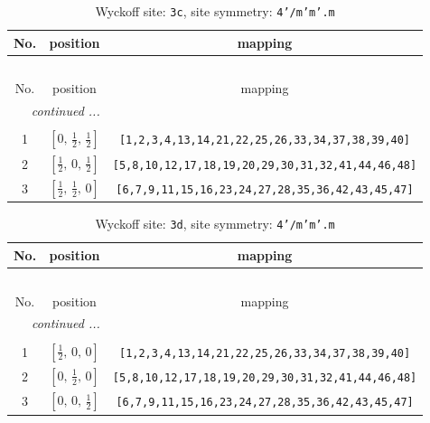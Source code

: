 \documentclass[fleqn,8pt]{jsarticle}
\begin{document}
\renewcommand{\arraystretch}{1.2}
\begin{longtable}{ccc}
\caption{Wyckoff site: {\tt 3c}, site symmetry: {\tt 4'/m'm'.m}}
 \\
 \hline \hline
No. & position & mapping \\ \hline \endfirsthead

\multicolumn{2}{l}{\tablename\ \thetable{}} \\
 \hline \hline
No. & position & mapping \\ \hline \endhead

 \hline \hline
\multicolumn{2}{r}{\footnotesize\it continued ...} \\ \endfoot

 \hline \hline
\multicolumn{2}{r}{} \\ \endlastfoot

1 & $\left[ 0,\, \frac{1}{2},\, \frac{1}{2} \right]$ & {\tt [1,2,3,4,13,14,21,22,25,26,33,34,37,38,39,40]} \\ \hline
2 & $\left[ \frac{1}{2},\, 0,\, \frac{1}{2} \right]$ & {\tt [5,8,10,12,17,18,19,20,29,30,31,32,41,44,46,48]} \\ \hline
3 & $\left[ \frac{1}{2},\, \frac{1}{2},\, 0 \right]$ & {\tt [6,7,9,11,15,16,23,24,27,28,35,36,42,43,45,47]} \\
\end{longtable}
\renewcommand{\arraystretch}{1.2}
\begin{longtable}{ccc}
\caption{Wyckoff site: {\tt 3d}, site symmetry: {\tt 4'/m'm'.m}}
 \\
 \hline \hline
No. & position & mapping \\ \hline \endfirsthead

\multicolumn{2}{l}{\tablename\ \thetable{}} \\
 \hline \hline
No. & position & mapping \\ \hline \endhead

 \hline \hline
\multicolumn{2}{r}{\footnotesize\it continued ...} \\ \endfoot

 \hline \hline
\multicolumn{2}{r}{} \\ \endlastfoot

1 & $\left[ \frac{1}{2},\, 0,\, 0 \right]$ & {\tt [1,2,3,4,13,14,21,22,25,26,33,34,37,38,39,40]} \\ \hline
2 & $\left[ 0,\, \frac{1}{2},\, 0 \right]$ & {\tt [5,8,10,12,17,18,19,20,29,30,31,32,41,44,46,48]} \\ \hline
3 & $\left[ 0,\, 0,\, \frac{1}{2} \right]$ & {\tt [6,7,9,11,15,16,23,24,27,28,35,36,42,43,45,47]} \\
\end{longtable}
\end{document}
